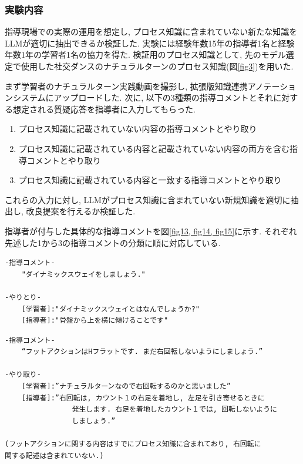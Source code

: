 \subsubsection{実験内容}
指導現場での実際の運用を想定し, プロセス知識に含まれていない新たな知識をLLMが適切に抽出できるか検証した. 実験には経験年数15年の指導者1名と経験年数1年の学習者1名の協力を得た. 検証用のプロセス知識として, 先のモデル選定で使用した社交ダンスのナチュラルターンのプロセス知識(図\ref{fig3})を用いた.

まず学習者のナチュラルターン実践動画を撮影し, 拡張版知識連携アノテーションシステムにアップロードした. 次に, 以下の3種類の指導コメントとそれに対する想定される質疑応答を指導者に入力してもらった.

\begin{enumerate}
    \item プロセス知識に記載されていない内容の指導コメントとやり取り
    
    \item プロセス知識に記載されている内容と記載されていない内容の両方を含む指導コメントとやり取り
    
    \item プロセス知識に記載されている内容と一致する指導コメントとやり取り
    
\end{enumerate}

これらの入力に対し, LLMがプロセス知識に含まれていない新規知識を適切に抽出し, 改良提案を行えるか検証した. 

指導者が付与した具体的な指導コメントを図\ref{fig13, fig14, fig15}に示す. それぞれ先述した1から3の指導コメントの分類に順に対応している.


\begin{tcolorbox}[breakable, colback=white, colframe=black]
    \begin{verbatim}
-指導コメント- 
    "ダイナミックスウェイをしましょう."

-やりとり- 
    [学習者]:"ダイナミックスウェイとはなんでしょうか?" 
    [指導者]:"骨盤から上を横に傾けることです" 
    \end{verbatim}
\end{tcolorbox}
    
\label{fig13}




\begin{tcolorbox}[breakable, colback=white, colframe=black]
    \begin{verbatim}
-指導コメント-
    “フットアクションはHフラットです. まだ右回転しないようにしましょう.”

-やり取り-
    [学習者]:”ナチュラルターンなので右回転するのかと思いました”
    [指導者]:”右回転は, カウント１の右足を着地し, 左足を引き寄せるときに
                発生します. 右足を着地したカウント１では, 回転しないように
                しましょう.”

(フットアクションに関する内容はすでにプロセス知識に含まれており, 右回転に
関する記述は含まれていない.)
    \end{verbatim}
\end{tcolorbox}
    
